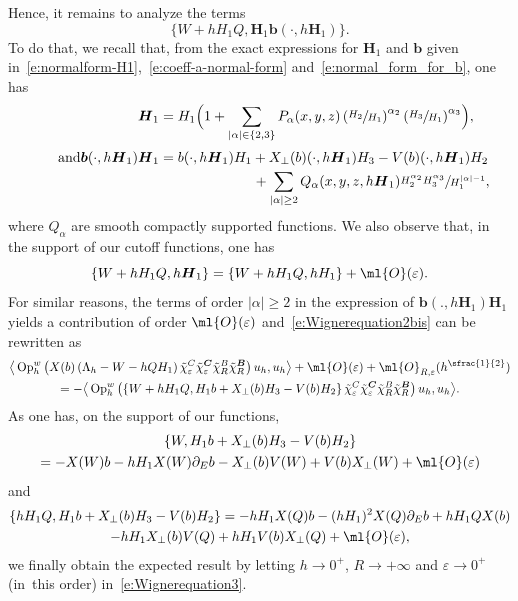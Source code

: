 \documentclass[10pt]{amsart}
\theoremstyle{plain}
\theoremstyle{definition}
\theoremstyle{remark}
\newcommand{\Op}{\operatorname{Op}}
\begin{document}
Hence, it remains to analyze the terms
\[
\bigl\{W+hH_1Q,\boldsymbol{H}_1 \boldsymbol{b}(\cdot,h \boldsymbol{H}_1)\bigr\}.
\]
To do that, we recall that, from the exact expressions for $\boldsymbol{H}_1$ and $\boldsymbol{b}$ given in~\eqref{e:normalform-H1},~\eqref{e:coeff-a-normal-form} and~\eqref{e:normal_form_for_b}, one has
\begin{align*}\textstyle
\boldsymbol{H}_1&=H_1\Bigl(1+\sum_{|\alpha|\in\{2,3\}}P_{\alpha}(x,y,z)\left(\sfrac{H_2}{H_1}\right)^{\alpha_2}\left(\sfrac{H_3}{H_1}\right)^{\alpha_3}\Bigr),
\\[3pt]
\tag*{and}
\boldsymbol{b}(\cdot,h\boldsymbol{H}_1)\boldsymbol{H}_1 & =b(\cdot,h\boldsymbol{H}_1)H_1+X_\perp(b)(\cdot,h\boldsymbol{H}_1)H_3-V(b)(\cdot,h\boldsymbol{H}_1)H_2\\
& \hspace*{2.35cm} +\sum_{|\alpha|\geq 2}Q_{\alpha}(x,y,z,h\boldsymbol{H}_1)\sfrac{H_2^{\alpha_2}H_3^{\alpha_3}}{H_1^{|\alpha|-1}},
\end{align*}
where $Q_\alpha$ are smooth compactly supported functions. We also observe that, in the support of our cutoff functions, one has
\[
\{W+hH_1Q,h\boldsymbol{H}_1\}=\{W+hH_1Q,hH_1\}+\ml{O}(\varepsilon).
\]
For similar reasons, the terms of order $|\alpha|\geq 2$ in the expression of $\boldsymbol{b}(.,h\boldsymbol{H}_1)\boldsymbol{H}_1$ yields a contribution of order $\ml{O}(\varepsilon)$ and~\eqref{e:Wignerequation2bis} can be rewritten as
\begin{multline}\label{e:Wignerequation3}
\big \langle\Op_h^w\left(X(b)\left(\Lambda_h-W-hQH_1\right)\tilde{\chi}_\varepsilon^C\tilde{\chi}_\varepsilon^{\boldsymbol{C}}\tilde{\chi}_R^B\tilde{\chi}_R^{\boldsymbol{B}}\right) u_h,u_h\big\rangle+\ml{O}(\varepsilon)+\ml{O}_{R,\varepsilon}(h^{\sfrac{1}{2}})\\
= -\big \langle\Op_h^w\left(\left\{W+hH_1Q,H_1 b+X_\perp(b)H_3-V(b)H_2\right\}\tilde{\chi}_\varepsilon^C\tilde{\chi}_\varepsilon^{\boldsymbol{C}}\tilde{\chi}_R^B\tilde{\chi}_R^{\boldsymbol{B}}\right) u_h,u_h\big\rangle.
\end{multline}
As one has, on the support of our functions,
\begin{multline*}
\{ W , H_1 b+X_\perp(b)H_3-V(b)H_2 \} \\
= - X(W)b - hH_1 X(W) \partial_Eb-X_\perp(b)V(W)+V(b)X_\perp(W)+\ml{O}(\varepsilon)
\end{multline*}
and
\begin{multline*}
\{ hH_1 Q, H_1 b+X_\perp(b)H_3-V(b)H_2 \}= - hH_1 X(Q) b - (hH_1)^2 X(Q) \partial_Eb + hH_1 Q X(b)\\
 - hH_1X_\perp(b)V(Q)+hH_1V(b)X_\perp(Q)+\ml{O}(\varepsilon),
\end{multline*}
we finally obtain the expected result by letting $h\to 0^+$, $R\to+\infty$ and $\varepsilon\to 0^+$ (in~this order) in~\eqref{e:Wignerequation3}.
\end{document}
